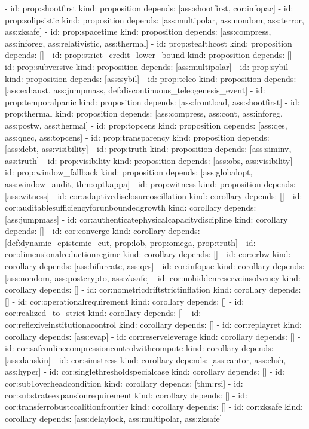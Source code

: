 \documentclass[11pt,a4paper]{article}
\theoremstyle{definition}
\theoremstyle{remark}
\begin{document}
\begin{YAML}
- id: prop:shootfirst
  kind: proposition
  depends: [ass:shootfirst, cor:infopac]
- id: prop:solipsistic
  kind: proposition
  depends: [ass:multipolar, ass:nondom, ass:terror, ass:zksafe]
- id: prop:spacetime
  kind: proposition
  depends: [ass:compress, ass:inforeg, ass:relativistic, ass:thermal]
- id: prop:stealthcost
  kind: proposition
  depends: []
- id: prop:strict_credit_lower_bound
  kind: proposition
  depends: []
- id: prop:subversive
  kind: proposition
  depends: [ass:multipolar]
- id: prop:sybil
  kind: proposition
  depends: [ass:sybil]
- id: prop:teleo
  kind: proposition
  depends: [ass:exhaust, ass:jumpmass, def:discontinuous_teleogenesis_event]
- id: prop:temporalpanic
  kind: proposition
  depends: [ass:frontload, ass:shootfirst]
- id: prop:thermal
  kind: proposition
  depends: [ass:compress, ass:cont, ass:inforeg, ass:postw, ass:thermal]
- id: prop:topcens
  kind: proposition
  depends: [ass:qes, ass:qnec, ass:topcens]
- id: prop:transparency
  kind: proposition
  depends: [ass:debt, ass:visibility]
- id: prop:truth
  kind: proposition
  depends: [ass:siminv, ass:truth]
- id: prop:visibility
  kind: proposition
  depends: [ass:obs, ass:visibility]
- id: prop:window_fallback
  kind: proposition
  depends: [ass:globalopt, ass:window_audit, thm:optkappa]
- id: prop:witness
  kind: proposition
  depends: [ass:witness]
- id: cor:adaptivedisclosureoscillation
  kind: corollary
  depends: []
- id: cor:auditablesufficiencyforunboundedgrowth
  kind: corollary
  depends: [ass:jumpmass]
- id: cor:authenticatephysicalcapacitydiscipline
  kind: corollary
  depends: []
- id: cor:converge
  kind: corollary
  depends: [def:dynamic_epistemic_cut, prop:lob, prop:omega, prop:truth]
- id: cor:dimensionalreductionregime
  kind: corollary
  depends: []
- id: cor:erbw
  kind: corollary
  depends: [ass:bifurcate, ass:qes]
- id: cor:infopac
  kind: corollary
  depends: [ass:nondom, ass:postcrypto, ass:zksafe]
- id: cor:nohiddenreserveinsolvency
  kind: corollary
  depends: []
- id: cor:nometricdriftstrictinflation
  kind: corollary
  depends: []
- id: cor:operationalrequirement
  kind: corollary
  depends: []
- id: cor:realized_to_strict
  kind: corollary
  depends: []
- id: cor:reflexiveinstitutionacontrol
  kind: corollary
  depends: []
- id: cor:replayret
  kind: corollary
  depends: [ass:evap]
- id: cor:reserveleverage
  kind: corollary
  depends: []
- id: cor:safeonlinecompressioncontrolwithcompute
  kind: corollary
  depends: [ass:danskin]
- id: cor:simstress
  kind: corollary
  depends: [ass:cantor, ass:chsh, ass:hyper]
- id: cor:singlethresholdspecialcase
  kind: corollary
  depends: []
- id: cor:sub1overheadcondition
  kind: corollary
  depends: [thm:rsi]
- id: cor:substrateexpansionrequirement
  kind: corollary
  depends: []
- id: cor:transferrobustcoalitionfrontier
  kind: corollary
  depends: []
- id: cor:zksafe
  kind: corollary
  depends: [ass:delaylock, ass:multipolar, ass:zksafe]
\end{YAML}
\end{document}
